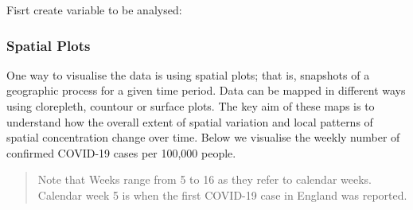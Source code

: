 \documentclass[
]{book}
\newenvironment{Shaded}{\begin{snugshade}}{\end{snugshade}}
\newcommand{\CommentTok}[1]{\textcolor[rgb]{0.56,0.35,0.01}{\textit{#1}}}
\newcommand{\DecValTok}[1]{\textcolor[rgb]{0.00,0.00,0.81}{#1}}
\newcommand{\KeywordTok}[1]{\textcolor[rgb]{0.13,0.29,0.53}{\textbf{#1}}}
\newcommand{\NormalTok}[1]{#1}
\newcommand{\OperatorTok}[1]{\textcolor[rgb]{0.81,0.36,0.00}{\textbf{#1}}}
\newcommand{\StringTok}[1]{\textcolor[rgb]{0.31,0.60,0.02}{#1}}
\begin{document}
Fisrt create variable to be analysed:

\begin{Shaded}
\end{Shaded}

\hypertarget{spatial-plots}{%
\subsubsection{Spatial Plots}\label{spatial-plots}}

One way to visualise the data is using spatial plots; that is, snapshots of a geographic process for a given time period. Data can be mapped in different ways using clorepleth, countour or surface plots. The key aim of these maps is to understand how the overall extent of spatial variation and local patterns of spatial concentration change over time. Below we visualise the weekly number of confirmed COVID-19 cases per 100,000 people.

\begin{quote}
Note that Weeks range from 5 to 16 as they refer to calendar weeks. Calendar week 5 is when the first COVID-19 case in England was reported.
\end{quote}
\end{document}

